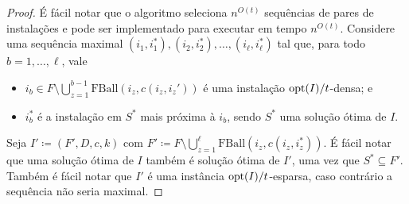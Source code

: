 \begin{proof}
    É fácil notar que o algoritmo seleciona $n^{O(t)}$ sequências de pares de instalações e pode ser implementado para executar em tempo $n^{O(t)}$. Considere uma sequência maximal $(i_1,i_1^*), (i_2,i_2^*), \ldots, (i_{\ell},i_{\ell}^*)$ tal que, para todo $b = 1, \ldots, \ell$, vale
    \begin{itemize}
        \item $i_b \in F \setminus \bigcup_{z=1}^{b-1} \text{FBall}(i_z,c(i_z,i_z'))$ é uma instalação $\mathrm{opt}(I)/t$-densa; e
        \item $i_b^*$ é a instalação em $S^*$ mais próxima à $i_b$, sendo $S^*$ uma solução ótima de $I$.
    \end{itemize}
    Seja $I' \coloneqq (F',D,c,k)$ com $F' \coloneqq F \setminus \bigcup_{z=1}^{\ell} \text{FBall}(i_z,c(i_z,i_z^*))$. É fácil notar que uma solução ótima de $I$ também é solução ótima de $I'$, uma vez que $S^* \subseteq F'$. Também é fácil notar que $I'$ é uma instância $\mathrm{opt}(I)/t$-esparsa, caso contrário a sequência não seria maximal.


\end{proof}

